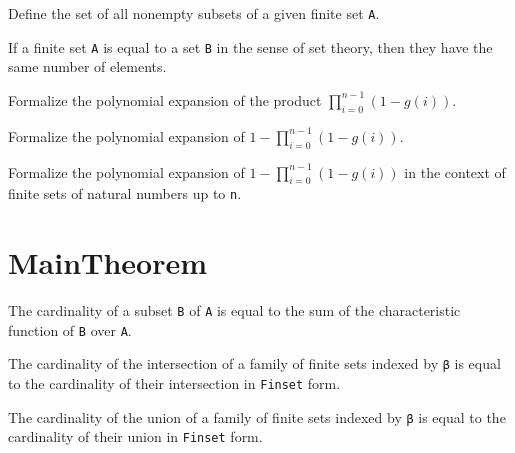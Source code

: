 \begin{definition}\label{Finset.powerset₀}
  \leanok
  Define the set of all nonempty subsets of a given finite set \verb|A|.
\end{definition}

\begin{lemma}\label{card_eq}
  If a finite set \verb|A| is equal to a set \verb|B| in the sense of set theory, then they have the same number of elements.
\end{lemma}

\begin{lemma}\label{mul_expand₃}
  Formalize the polynomial expansion of the product \(\prod_{i=0}^{n-1} (1 - g(i))\).
\end{lemma}

\begin{lemma}\label{mul_expand₂}
  Formalize the polynomial expansion of \(1 - \prod_{i=0}^{n-1} (1 - g(i))\).
\end{lemma}

\begin{lemma}\label{mul_expand₁}
  Formalize the polynomial expansion of \(1 - \prod_{i=0}^{n-1} (1 - g(i))\) in the context of finite sets of natural numbers up to \verb|n|.
\end{lemma}


\section{MainTheorem}

\begin{lemma}\label{card_eq_sum_char_fun}
  The cardinality of a subset \verb|B| of \verb|A| is equal to the sum of the characteristic function of \verb|B| over \verb|A|.
\end{lemma}

\begin{lemma}\label{card_eq_FinInter}
  The cardinality of the intersection of a family of finite sets indexed by \verb|β| is equal to the cardinality of their intersection in \verb|Finset| form.
\end{lemma}

\begin{lemma}\label{card_eq_FinUnion}
  The cardinality of the union of a family of finite sets indexed by \verb|β| is equal to the cardinality of their union in \verb|Finset| form.
\end{lemma}


